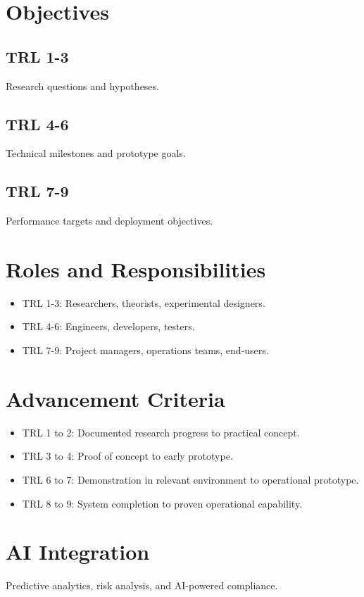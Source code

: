 \documentclass{article}
\begin{document}
\section{Objectives}

\subsection{TRL 1-3}
Research questions and hypotheses.

\subsection{TRL 4-6}
Technical milestones and prototype goals.

\subsection{TRL 7-9}
Performance targets and deployment objectives.

\section{Roles and Responsibilities}
\begin{itemize}
    \item TRL 1-3: Researchers, theorists, experimental designers.
    \item TRL 4-6: Engineers, developers, testers.
    \item TRL 7-9: Project managers, operations teams, end-users.
\end{itemize}

\section{Advancement Criteria}
\begin{itemize}
    \item TRL 1 to 2: Documented research progress to practical concept.
    \item TRL 3 to 4: Proof of concept to early prototype.
    \item TRL 6 to 7: Demonstration in relevant environment to operational prototype.
    \item TRL 8 to 9: System completion to proven operational capability.
\end{itemize}

\section{AI Integration}
Predictive analytics, risk analysis, and AI-powered compliance.
\end{document}
